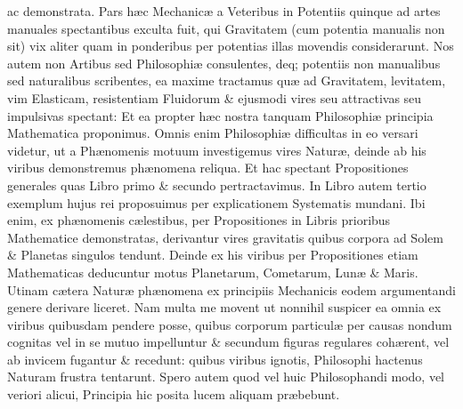 \documentclass{ansarticle}
\begin{document}
ac demonstrata. Pars h\ae{}c Mechanic\ae{} a Veteribus in Potentiis
quinque ad artes manuales spectantibus exculta fuit, qui Gravitatem
(cum potentia manualis non sit) vix aliter quam in ponderibus per
potentias illas movendis considerarunt. Nos autem non Artibus sed
Philosophi\ae{} consulentes, deq; potentiis non manualibus sed
naturalibus scribentes, ea maxime tractamus qu\ae{} ad Gravitatem,
levitatem, vim Elasticam, resistentiam Fluidorum \& ejusmodi vires seu
attractivas seu impulsivas spectant: Et ea propter h\ae{}c nostra
tanquam Philosophi\ae{} principia Mathematica proponimus. Omnis enim
Philosophi\ae{} difficultas in eo versari videtur, ut a Ph\ae{}nomenis
motuum investigemus vires Natur\ae{}, deinde ab his viribus
demonstremus ph\ae{}nomena reliqua. Et hac spectant Propositiones
generales quas Libro primo \& secundo pertractavimus. In Libro autem
tertio exemplum hujus rei proposuimus per explicationem Systematis
mundani. Ibi enim, ex ph\ae{}nomenis c\ae{}lestibus, per Propositiones
in Libris prioribus Mathematice demonstratas, derivantur vires
gravitatis quibus corpora ad Solem \& Planetas singulos
tendunt. Deinde ex his viribus per Propositiones etiam Mathematicas
deducuntur motus Planetarum, Cometarum, Lun\ae{} \& Maris. Utinam
c\ae{}tera Natur\ae{} ph\ae{}nomena ex principiis Mechanicis eodem
argumentandi genere derivare liceret. Nam multa me movent ut nonnihil
suspicer ea omnia ex viribus quibusdam pendere posse, quibus corporum
particul\ae{} per causas nondum cognitas vel in se mutuo impelluntur
\& secundum figuras regulares coh\ae{}rent, vel ab invicem fugantur \&
recedunt: quibus viribus ignotis, Philosophi hactenus Naturam frustra
tentarunt. Spero autem quod vel huic Philosophandi modo, vel veriori
alicui, Principia hic posita lucem aliquam pr\ae{}bebunt.
\end{document}
